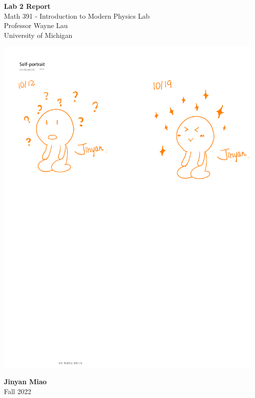\documentclass[11pt]{book}
\theoremstyle{break}
\theoremstyle{break}
\begin{document}
	\begin{titlepage}
		\begin{center}
			\vspace*{1cm}
			\Huge \color{red}
				\textbf{Lab 2 Report}\\
			\vspace{0.5cm}			
			\Large \color{black}
				Math 391 - Introduction to Modern Physics Lab\\
				Professor Wayne Lau\\	
				University of Michigan\\
			\vspace{3cm}

			\includegraphics[scale=1.16]{Jinyan'sPortrait.pdf}
			
			
			\vspace{5cm}
			\LARGE
				\textbf{Jinyan Miao}\\
				\hfill\break
				\LARGE Fall 2022\\
			\vspace{1cm}

		\vspace*{\fill}
		\end{center}			
	\end{titlepage}
\end{document}
